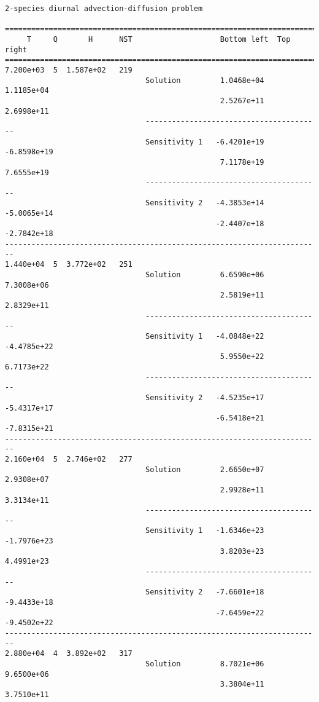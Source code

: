 \begin{verbatim}
2-species diurnal advection-diffusion problem

========================================================================
     T     Q       H      NST                    Bottom left  Top right 
========================================================================
7.200e+03  5  1.587e+02   219
                                Solution         1.0468e+04   1.1185e+04 
                                                 2.5267e+11   2.6998e+11 
                                ----------------------------------------
                                Sensitivity 1   -6.4201e+19  -6.8598e+19 
                                                 7.1178e+19   7.6555e+19 
                                ----------------------------------------
                                Sensitivity 2   -4.3853e+14  -5.0065e+14 
                                                -2.4407e+18  -2.7842e+18 
------------------------------------------------------------------------
1.440e+04  5  3.772e+02   251
                                Solution         6.6590e+06   7.3008e+06 
                                                 2.5819e+11   2.8329e+11 
                                ----------------------------------------
                                Sensitivity 1   -4.0848e+22  -4.4785e+22 
                                                 5.9550e+22   6.7173e+22 
                                ----------------------------------------
                                Sensitivity 2   -4.5235e+17  -5.4317e+17 
                                                -6.5418e+21  -7.8315e+21 
------------------------------------------------------------------------
2.160e+04  5  2.746e+02   277
                                Solution         2.6650e+07   2.9308e+07 
                                                 2.9928e+11   3.3134e+11 
                                ----------------------------------------
                                Sensitivity 1   -1.6346e+23  -1.7976e+23 
                                                 3.8203e+23   4.4991e+23 
                                ----------------------------------------
                                Sensitivity 2   -7.6601e+18  -9.4433e+18 
                                                -7.6459e+22  -9.4502e+22 
------------------------------------------------------------------------
2.880e+04  4  3.892e+02   317
                                Solution         8.7021e+06   9.6500e+06 
                                                 3.3804e+11   3.7510e+11 

\end{verbatim}
